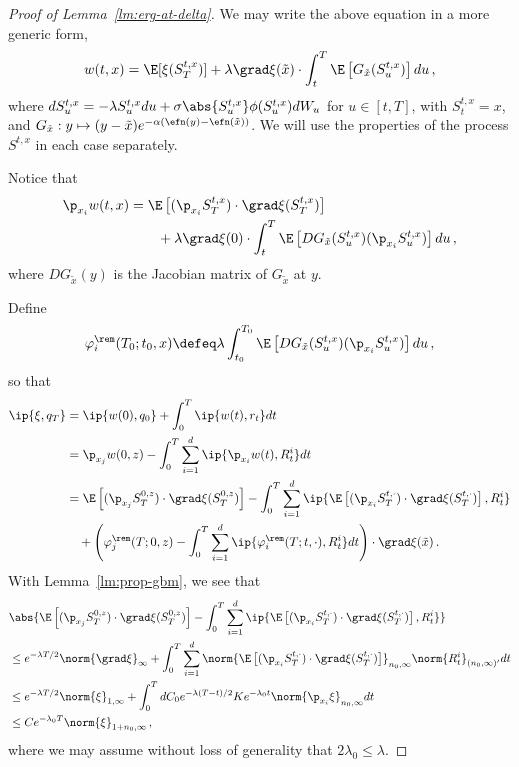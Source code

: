 \documentclass{amsart}
\begin{document}
\begin{proof}[Proof of Lemma~\ref{lm:erg-at-delta}]
	We may write the above equation in a more generic form, 
	\begin{equation*}
		w(t,x) = \E [ \xi(S^{t,x}_{T}) ] + \lambda \grad\xi(\tilde x) \cdot \int_t^T  \E \left[G_{\tilde x} (S^{t,x}_u) \right] du \,,
	\end{equation*}
	where $dS^{t,x}_u = -\lambda S^{t,x}_u du + \sigma \abs{S^{t,x}_u} \phi(S^{t,x}_u) dW_u$ for $u \in [t,T]$, with $S^{t,x}_t = x$, and $G_{\tilde x}: y \mapsto (y-\tilde x) e^{-\alpha (\efn(y) - \efn(\tilde x)) }$. 
	We will use the properties of the process $S^{t,x}$ in each case separately. 

	\step[Case $q_0 = -\p_{x_j} \delta_z$]
	Notice that 
	\begin{align*}
		\p_{x_i} w(t,x) & = \E \left[ (\p_{x_i} S^{t,x}_T) \cdot \grad \xi (S^{t,x}_T) \right] \\
		& \qquad + \lambda \grad\xi(0) \cdot \int_t^T  \E \left[ D G_{\tilde x} (S^{t,x}_u) (\p_{x_i} S^{t,x}_u) \right] du \,,
	\end{align*}
    where $D G_{\tilde x}(y)$ is the Jacobian matrix of $G_{\tilde x}$ at $y$. 
    
	Define 
	\begin{equation*}
		\varphi_i^\rem(T_0;t_0,x) \defeq \lambda \int_{t_0}^{T_0} \E \left[  D G_{\tilde x} (S^{t,x}_u) (\p_{x_i} S^{t,x}_u) \right] du \,,
	\end{equation*}
	so that 
	\begin{align*}
		\ip{\xi, q_T} & = \ip{w(0), q_0} + \int_0^T \ip{w(t), r_t} dt \\
		& = \p_{x_j} w(0,z) - \int_0^T \sum_{i=1}^d \ip{\p_{x_i} w(t), R^i_t} dt \\
		& = \E \left[ (\p_{x_j} S^{0,z}_{T}) \cdot \grad \xi (S^{0,z}_{T}) \right] - \int_0^T \sum_{i=1}^d \ip{ \E \left[ (\p_{x_i} S^{t,\cdot}_T) \cdot \grad \xi (S^{t,\cdot}_T) \right], R^i_t } \\
		& \quad + \left( \varphi_j^\rem(T;0,z) - \int_0^T \sum_{i=1}^d \ip{ \varphi_i^\rem(T;t,\cdot), R^i_t } dt \right) \cdot \grad \xi(\tilde x) \,. 
	\end{align*}
	With Lemma~\ref{lm:prop-gbm}, we see that  
	\begin{align*}
		& \abs{\E \left[ (\p_{x_j} S^{0,z}_{T}) \cdot \grad \xi (S^{0,z}_{T}) \right] - \int_0^T \sum_{i=1}^d \ip{ \E \left[ (\p_{x_i} S^{t,\cdot}_T) \cdot \grad \xi (S^{t,\cdot}_T) \right], R^i_t }} \\
		& \le e^{-\lambda T/2} \norm{\grad \xi}_\infty + \int_0^T \sum_{i=1}^d \norm{\E \left[ (\p_{x_i} S^{t,\cdot}_T) \cdot \grad \xi (S^{t,\cdot}_T) \right]}_{n_0,\infty} \norm{R^i_t}_{(n_0,\infty)'} dt \\
		& \le e^{-\lambda T/2} \norm{\xi}_{1,\infty} + \int_0^T d C_0 e^{-\lambda (T-t)/2} K e^{-\lambda_0 t} \norm{\p_{x_i} \xi}_{n_0,\infty} dt \\
		& \le C e^{-\lambda_0 T} \norm{\xi}_{1+n_0,\infty} \,,
	\end{align*}
	where we may assume without loss of generality that $2\lambda_0 \le \lambda$.


\end{proof}
\end{document}

